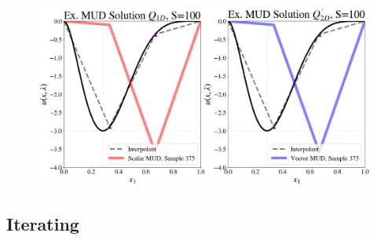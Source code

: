 \begin{frame}[t]

\begin{figure}
  \includegraphics[width=0.95\linewidth]{figures/pde-highd/pde-highd_comp_exmud_D2_m100.png}
\label{fig:pde-highd-2d-scalar-vs-alt}
\end{figure}

\end{frame}


\subsection{Iterating}

